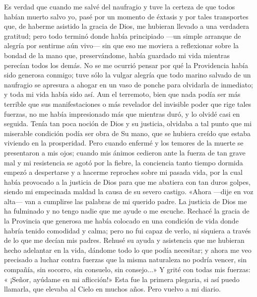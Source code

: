 \documentclass{novela}
\begin{document}
    Es verdad que cuando me salvé del naufragio y tuve la certeza de que todos habían muerto salvo yo, pasé por un momento de éxtasis y por tales transportes que, de haberme asistido la gracia de Dios, me hubieran llevado a una verdadera gratitud; pero todo terminó donde había principiado —un simple arranque de alegría por sentirme aún vivo— sin que eso me moviera a reflexionar sobre la bondad de la mano que, preservándome, había guardado mi vida mientras perecían todos los demás. No se me ocurrió pensar por qué la Providencia había sido generosa conmigo; tuve sólo la vulgar alegría que todo marino salvado de un naufragio se apresura a ahogar en un vaso de ponche para olvidarla de inmediato; y toda mi vida había sido así.
    Aun el terremoto, bien que nada podía ser más terrible que sus manifestaciones o más revelador del invisible poder que rige tales fuerzas, no me había impresionado más que mientras duró, y lo olvidé casi en seguida. Tenía tan poca noción de Dios y su justicia, olvidaba a tal punto que mi miserable condición podía ser obra de Su mano, que se hubiera creído que estaba viviendo en la prosperidad. Pero cuando enfermé y los temores de la muerte se presentaron a mis ojos; cuando mis ánimos cedieron ante la fuerza de tan grave mal y mi resistencia se agotó por la fiebre, la conciencia tanto tiempo dormida empezó a despertarse y a hacerme reproches sobre mi pasada vida, por la cual había provocado a la justicia de Dios para que me abatiera con tan duros golpes, siendo mi empecinada maldad la causa de su severo castigo.
    «Ahora —dije en voz alta— van a cumplirse las palabras de mi querido padre. La justicia de Dios me ha fulminado y no tengo nadie que me ayude o me escuche. Rechacé la gracia de la Provincia que generosa me había colocado en una condición de vida donde habría tenido comodidad y calma; pero no fui capaz de verlo, ni siquiera a través de lo que me decían mis padres. Rehusé su ayuda y asistencia que me hubieran hecho adelantar en la vida, dándome todo lo que podía necesitar; y ahora me veo precisado a luchar contra fuerzas que la misma naturaleza no podría vencer, sin compañía, sin socorro, sin consuelo, sin consejo...» Y grité con todas mis fuerzas: « ¡Señor, ayúdame en mi aflicción!»
    Esta fue la primera plegaria, si así puedo llamarla, que elevaba al Cielo en muchos años. Pero vuelvo a mi diario.
\end{document}
